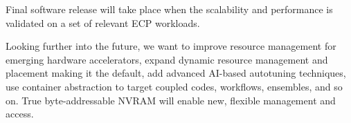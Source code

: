 Final software release will take place when the scalability and performance
is validated on a set of relevant ECP workloads.

Looking further into the future, we want to improve resource management for
emerging hardware accelerators, expand dynamic resource management and
placement making it the default, add advanced AI-based autotuning
techniques, use container abstraction to target coupled codes, workflows,
ensembles, and so on.  True byte-addressable NVRAM will enable new,
flexible management and access.
